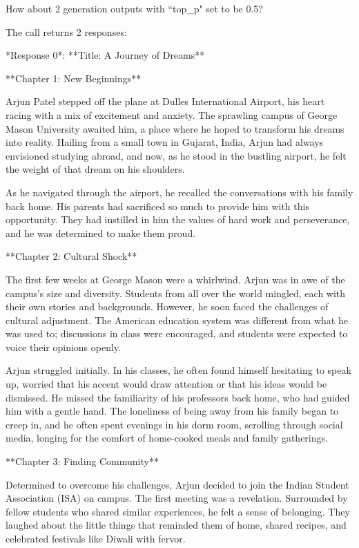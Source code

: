 \documentclass[11pt,addpoints,answers]{exam}
\begin{document}
\begin{questions}
    
    \question[5] How about 2 generation outputs with ``top\_p" set to be 0.5?
    
    \begin{tcolorbox}[fit,height=22cm, width=16cm, blank, borderline={1pt}{-2pt},nobeforeafter]
    The call returns 2 responses:

*Response 0*:  **Title: A Journey of Dreams**

**Chapter 1: New Beginnings**

Arjun Patel stepped off the plane at Dulles International Airport, his heart racing with a mix of excitement and anxiety. The sprawling campus of George Mason University awaited him, a place where he hoped to transform his dreams into reality. Hailing from a small town in Gujarat, India, Arjun had always envisioned studying abroad, and now, as he stood in the bustling airport, he felt the weight of that dream on his shoulders.

As he navigated through the airport, he recalled the conversations with his family back home. His parents had sacrificed so much to provide him with this opportunity. They had instilled in him the values of hard work and perseverance, and he was determined to make them proud.

**Chapter 2: Cultural Shock**

The first few weeks at George Mason were a whirlwind. Arjun was in awe of the campus's size and diversity. Students from all over the world mingled, each with their own stories and backgrounds. However, he soon faced the challenges of cultural adjustment. The American education system was different from what he was used to; discussions in class were encouraged, and students were expected to voice their opinions openly.

Arjun struggled initially. In his classes, he often found himself hesitating to speak up, worried that his accent would draw attention or that his ideas would be dismissed. He missed the familiarity of his professors back home, who had guided him with a gentle hand. The loneliness of being away from his family began to creep in, and he often spent evenings in his dorm room, scrolling through social media, longing for the comfort of home-cooked meals and family gatherings.

**Chapter 3: Finding Community**

Determined to overcome his challenges, Arjun decided to join the Indian Student Association (ISA) on campus. The first meeting was a revelation. Surrounded by fellow students who shared similar experiences, he felt a sense of belonging. They laughed about the little things that reminded them of home, shared recipes, and celebrated festivals like Diwali with fervor.


\end{tcolorbox}
\end{questions}
\end{document}
